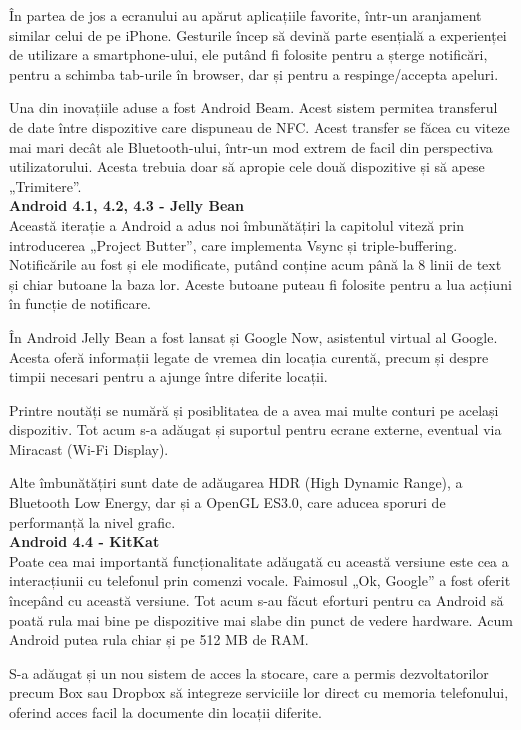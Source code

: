 \documentclass[12pt,a4paper]{article}
\begin{document}
	În partea de jos a ecranului au apărut aplicațiile favorite, într-un aranjament similar celui de pe iPhone. Gesturile încep să devină parte esențială a experienței de utilizare a smartphone-ului, ele putând fi folosite pentru a șterge notificări, pentru a schimba tab-urile în browser, dar și pentru a respinge/accepta apeluri.

	Una din inovațiile aduse a fost Android Beam. Acest sistem permitea transferul de date între dispozitive care dispuneau de NFC. Acest transfer se făcea cu viteze mai mari decât ale Bluetooth-ului, într-un mod extrem de facil din perspectiva utilizatorului. Acesta trebuia doar să apropie cele două dispozitive și să apese „Trimitere”.\\

\textbf{Android 4.1, 4.2, 4.3 - Jelly Bean}\\
Această iterație a Android a adus noi îmbunătățiri la capitolul viteză prin introducerea „Project Butter”, care implementa Vsync și triple-buffering. Notificările au fost și ele modificate, putând conține acum până la 8 linii de text și chiar butoane la baza lor. Aceste butoane puteau fi folosite pentru a lua acțiuni în funcție de notificare.

	În Android Jelly Bean a fost lansat și Google Now, asistentul virtual al Google. Acesta oferă informații legate de vremea din locația curentă, precum și despre timpii necesari pentru a ajunge între diferite locații.

	Printre noutăți se numără și posiblitatea de a avea mai multe conturi pe același dispozitiv. Tot acum s-a adăugat și suportul pentru ecrane externe, eventual via Miracast (Wi-Fi Display).

	Alte îmbunătățiri sunt date de adăugarea HDR (High Dynamic Range), a Bluetooth Low Energy, dar și a OpenGL ES3.0, care aducea sporuri de performanță la nivel grafic.\\

\textbf{Android 4.4 - KitKat}\\
Poate cea mai importantă funcționalitate adăugată cu această versiune este cea a interacțiunii cu telefonul prin comenzi vocale. Faimosul „Ok, Google” a fost oferit începând cu această versiune. Tot acum s-au făcut eforturi pentru ca Android să poată rula mai bine pe dispozitive mai slabe din punct de vedere hardware. Acum Android putea rula chiar și pe 512 MB de RAM.

	S-a adăugat și un nou sistem de acces la stocare, care a permis dezvoltatorilor precum Box sau Dropbox să integreze serviciile lor direct cu memoria telefonului, oferind acces facil la documente din locații diferite.
\end{document}
